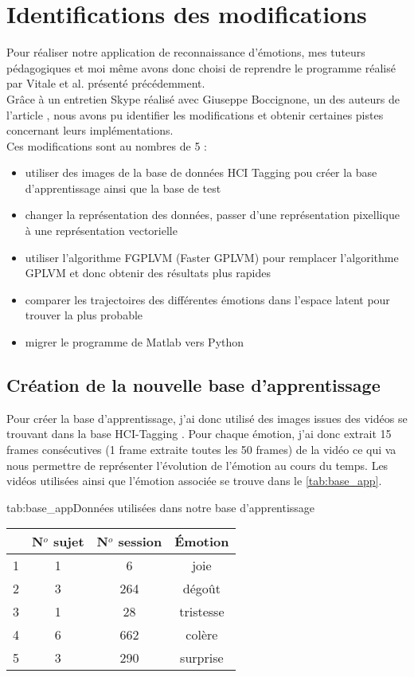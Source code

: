 \documentclass[poster]{polytech/polytech}
\begin{document}
\chapter{Identifications des modifications}
Pour réaliser notre application de reconnaissance d'émotions, mes tuteurs pédagogiques et moi même avons donc choisi de reprendre le programme réalisé par Vitale et al. présenté précédemment.\\
Grâce à un entretien Skype réalisé avec Giuseppe Boccignone, un des auteurs de l'article \cite{italiens}, nous avons pu identifier les modifications et obtenir certaines pistes concernant leurs implémentations.\\
Ces modifications sont au nombres de 5 :
\begin{itemize}
\item utiliser des images de la base de données HCI Tagging pou créer la base d'apprentissage ainsi que la base de test
\item changer la représentation des données, passer d'une représentation pixellique à une représentation vectorielle
\item utiliser l'algorithme FGPLVM (Faster GPLVM) pour remplacer l'algorithme GPLVM et donc obtenir des résultats plus rapides
\item comparer les trajectoires des différentes émotions dans l'espace latent pour trouver la plus probable
\item migrer le programme de Matlab vers Python
\end{itemize}
\newpage

\section{Création de la nouvelle base d'apprentissage}
Pour créer la base d'apprentissage, j'ai donc utilisé des images issues des vidéos se trouvant dans la base HCI-Tagging \cite{tagging1}\cite{tagging2}. Pour chaque émotion, j'ai donc extrait 15 frames consécutives (1 frame extraite toutes les 50 frames) de la vidéo ce qui va nous permettre de représenter l'évolution de l'émotion au cours du temps. Les vidéos utilisées ainsi que l'émotion associée se trouve dans le \autoref{tab:base_app}.

\begin{Table}{tab:base_app}{Données utilisées dans notre base d'apprentissage}
	\begin{tabular}{|c|c|c|c|}
		\hline
		  &\textbf{N$^{o}$ sujet} &\textbf{N$^{o}$ session}&\textbf{Émotion} \\\hline
		1& 1 & 6& joie\\\hline
		2& 3 & 264& dégoût\\\hline
		3& 1 & 28& tristesse\\\hline
		4& 6 & 662& colère\\\hline
		5& 3 & 290& surprise\\\hline
	\end{tabular}
\end{Table}
\end{document}
